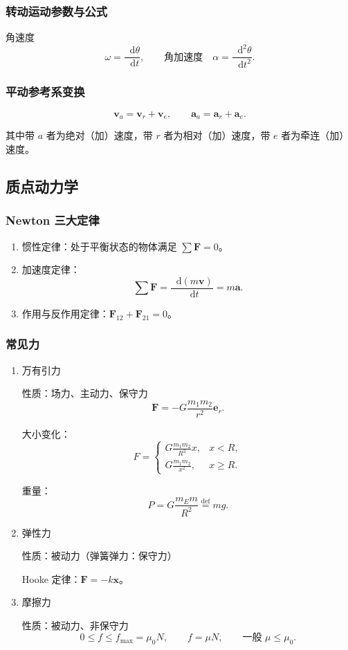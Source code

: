 \documentclass[UTF8,fontset=fandol,zihao=5]{ctexart}
\newcommand{\vect}[1]{\bm{#1}}
\newcommand{\dif}{\mathop{}\!\mathrm{d}}
\begin{document}
\subsubsection{转动运动参数与公式}

角速度
\[
  \omega=\frac{\dif\theta}{\dif t},
  \qquad
  \text{角加速度}\quad \alpha=\frac{\dif^2\theta}{\dif t^2}.
\]

\subsubsection{平动参考系变换}

\[
  \vect v_a=\vect v_r+\vect v_e,
  \qquad
  \vect a_a=\vect a_r+\vect a_e.
\]

其中带 \(a\) 者为绝对（加）速度，带 \(r\) 者为相对（加）速度，带 \(e\) 者为牵连（加）速度。

\subsection{质点动力学}

\subsubsection{Newton 三大定律}

\begin{enumerate}
  \item 惯性定律：处于平衡状态的物体满足 \(\sum\vect F=0\)。
  \item 加速度定律：
  \[
    \sum\vect F=\frac{\dif(m\vect v)}{\dif t}=m\vect a.
  \]
  \item 作用与反作用定律：\(\vect F_{12}+\vect F_{21}=0\)。
\end{enumerate}

\subsubsection{常见力}

\begin{enumerate}
  \item 万有引力

  性质：场力、主动力、保守力
  \[
    \vect F=-G\frac{m_1m_2}{r^2}\vect e_r.
  \]

  大小变化：
  \[
    F=
    \begin{cases}
      \displaystyle G\frac{m_1m_2}{R^3}x, & x<R,\\[4pt]
      \displaystyle G\frac{m_1m_2}{x^2}, & x\ge R.
    \end{cases}
  \]

  重量：
  \[
    P=G\frac{m_Em}{R^2}\overset{\mathrm{def}}{=}mg.
  \]

  \item 弹性力

  性质：被动力（弹簧弹力：保守力）

  Hooke 定律：\(\vect F=-k\vect x\)。

  \item 摩擦力

  性质：被动力、非保守力
  \[
    0\le f\le f_{\max}=\mu_0N,
    \qquad
    f=\mu N,
    \qquad
    \text{一般 }\mu\le\mu_0.
  \]
\end{enumerate}
\end{document}
